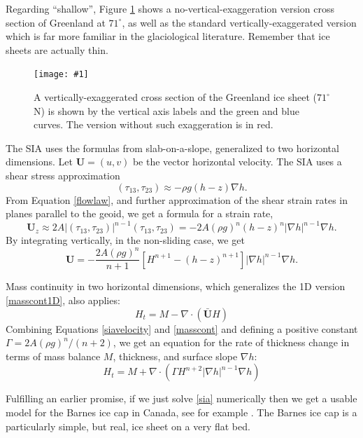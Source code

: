 \documentclass[titlepage,letterpaper,final,12pt]{scrartcl}
\newcommand{\grad}{\nabla}
\newcommand{\Div}{\nabla\cdot}
\newcommand{\onefigsize}[3]{
\begin{figure}[ht]
\centering
\texttt{[image: \#1]}
\caption{#2}
\label{fig:#1}
\end{figure}}
\newcommand{\onefig}[2]{\onefigsize{#1}{#2}{3.0in}}
\begin{document}
Regarding ``shallow'', Figure \ref{fig:green_transect} shows a no-vertical-exaggeration version cross section of Greenland at $71^\circ$, as well as the standard vertically-exaggerated version which is far more familiar in the glaciological literature.  Remember that ice sheets are actually thin.

\onefig{green_transect}{A vertically-exaggerated cross section of the Greenland ice sheet ($71^\circ$ N) is shown by the vertical axis labels and the green and blue curves.  The version without such exaggeration is in red.}

The SIA uses the formulas from slab-on-a-slope, generalized to two horizontal dimensions.  Let $\mathbf{U} = (u,v)$ be the vector horizontal velocity.  The SIA uses a shear stress approximation
	$$(\tau_{13},\tau_{23}) \approx - \rho g (h-z) \nabla h.$$
From Equation \eqref{flowlaw}, and further approximation of the shear strain rates in planes parallel to the geoid, we get a formula for a strain rate,
\begin{equation*}
\mathbf{U}_z \approx 2 A |(\tau_{13},\tau_{23})|^{n-1} (\tau_{13},\tau_{23}) = - 2 A (\rho g)^n (h-z)^n |\nabla h|^{n-1} \nabla h.
\end{equation*}
By integrating vertically, in the non-sliding case, we get
\begin{equation}
\mathbf{U} = - \frac{2 A (\rho g)^n}{n+1} \left[H^{n+1} - (h-z)^{n+1}\right] |\nabla h|^{n-1} \nabla h.  \label{siavelocity}
\end{equation}

Mass continuity in two horizontal dimensions, which generalizes the 1D version \eqref{masscont1D}, also applies:
\begin{equation}
    H_t = M - \Div\left(\bar{\mathbf{U}} H\right)  \label{masscont}
\end{equation}
Combining Equations \eqref{siavelocity} and \eqref{masscont} and defining a positive constant $\Gamma = 2 A (\rho g)^n / (n+2)$, we get an equation for the rate of thickness change in terms of mass balance $M$, thickness, and surface slope $\grad h$:
\begin{equation}
H_t = M + \Div \left(\Gamma H^{n+2} |\grad h|^{n-1} \grad h \right) \label{sia}
\end{equation}

Fulfilling an earlier promise, if we just solve \eqref{sia} numerically then we get a usable model for the Barnes ice cap in Canada, see for example \cite{Mahaffy}.  The Barnes ice cap is a particularly simple, but real, ice sheet on a very flat bed.
\end{document}
